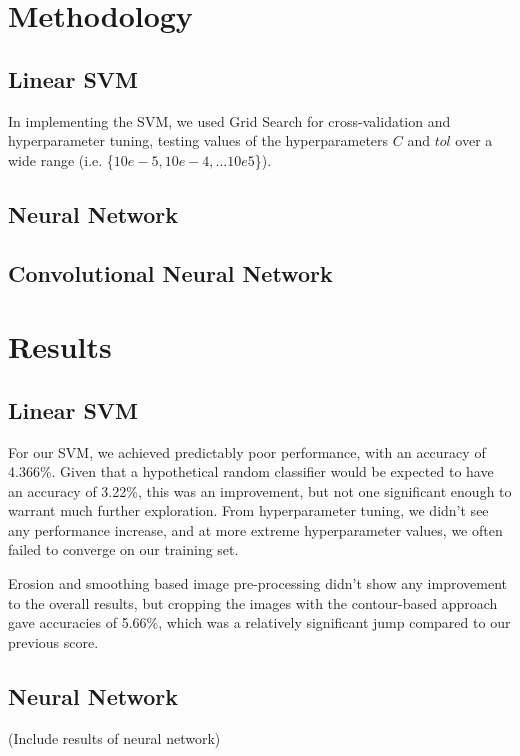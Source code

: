 \documentclass[conference]{IEEEtran}
\begin{document}
\section{Methodology}

\subsection{Linear SVM}

In implementing the SVM, we used Grid Search for cross-validation and hyperparameter tuning, testing values of the hyperparameters $C$ and $tol$ over a wide range (i.e. \{$10e-5, 10e-4, \ldots 10e5$\}).

\subsection{Neural Network}


\subsection{Convolutional Neural Network}


\section{Results}

\subsection{Linear SVM}

For our SVM, we achieved predictably poor performance, with an accuracy of 4.366\%. Given that a hypothetical random classifier would be expected to have an accuracy of 3.22\%, this was an improvement, but not one significant enough to warrant much further exploration. From hyperparameter tuning, we didn't see any performance increase, and at more extreme hyperparameter values, we often failed to converge on our training set.

Erosion and smoothing based image pre-processing didn't show any improvement to the overall results, but cropping the images with the contour-based approach gave accuracies of 5.66\%, which was a relatively significant jump compared to our previous score.

\subsection{Neural Network}
(Include results of neural network)
\end{document}
